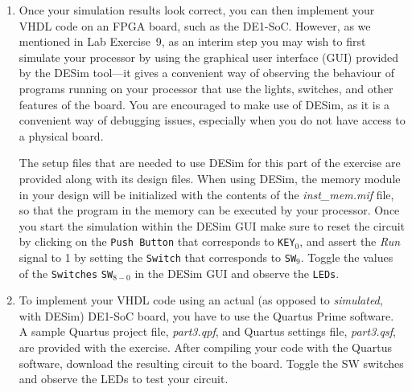 \documentclass[epsfig,10pt,fullpage]{article} \addtolength{\textwidth}{1.5in}
\begin{document}
\begin{enumerate}
\lstset{language=ASM,numbers=none,escapechar=|}
\begin{figure}[H]
\begin{center}
\begin{minipage}[h]{12.5 cm}
\begin{lstlisting}[name=proc]
|\label{line:module}|.define LED_ADDRESS 0x10
.define SW_ADDRESS 0x30

// Read SW switches and display on LEDs
			mvt	r3, #LED_ADDRESS	// point to LED port
			mvt	r4, #SW_ADDRESS	// point to SW port
MAIN:		ld		r0, [r4]				// read SW values
			st		r0, [r3]				// light up LEDs
			mv 	pc, #MAIN
\end{lstlisting}
\end{minipage}
\caption{Assembly-language program that uses {\it ld} and {\it st} instructions.}
\label{fig:assembly}
\end{center}
\end{figure}

An example simulation result for a correctly-designed circuit 
is given in Figure~\ref{fig:part3}. It shows the execution of the first four instructions
in Figure~\ref{fig:assembly}.

\item Once your simulation results look correct, you can then implement your VHDL
code on an FPGA board, such as the DE1-SoC. However, as we mentioned in Lab Exercise~9, as
an interim step you may wish to first simulate your processor by using the graphical user
interface (GUI) provided by the DESim tool---it gives a convenient way of observing the behaviour 
of programs running on your processor that use the lights, switches, and other features of 
the board. You are encouraged to make use of DESim, as it
is a convenient way of debugging issues, especially when you do not have access to a 
physical board.

The setup files that are needed to use DESim for this part of the exercise are provided along
with its design files.  When using DESim, the memory module in your design will be initialized with
the contents of the {\it inst\_mem.mif} file, so that the program in the memory 
can be executed by your processor. Once you start the simulation within the DESim GUI make sure to 
reset the circuit by clicking on the \texttt{Push Button} that corresponds to
\texttt{KEY}$_0$, and assert the {\it Run} signal to 1 by setting the \texttt{Switch}
that corresponds to \texttt{SW}$_9$. Toggle the values of the \texttt{Switches}
\texttt{SW}$_{8-0}$ in the DESim GUI and observe the \texttt{LEDs}. 

\item
To implement your VHDL code using an actual (as opposed to {\it simulated}, with DESim) 
DE1-SoC board, you have to use the Quartus Prime software.
A sample Quartus project file, {\it part3.qpf}, and Quartus
settings file, {\it part3.qsf}, are provided with the exercise. After compiling your code 
with the Quartus software, download the resulting circuit 
to the board. Toggle the SW switches and observe the LEDs to test your circuit.
\end{enumerate}
\end{document}
